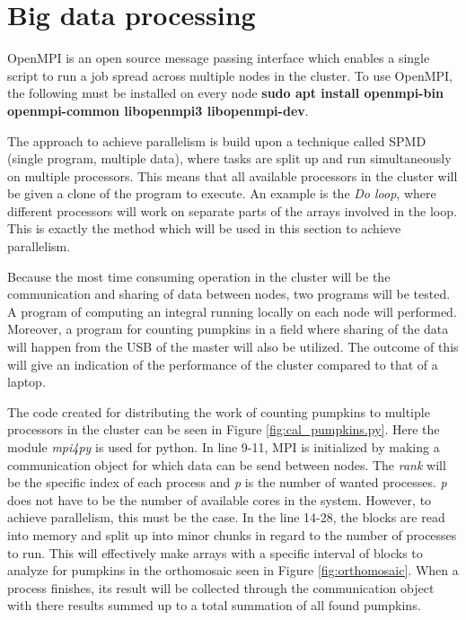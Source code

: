 \documentclass[../Head/Report.tex]{subfiles}
\begin{document}
\section{Big data processing}

OpenMPI is an open source message passing interface which enables a single script to run a job spread across multiple nodes in the cluster. To use OpenMPI, the following must be installed on every node \textbf{sudo apt install openmpi-bin openmpi-common libopenmpi3 libopenmpi-dev}. 

The approach to achieve parallelism is build upon a technique called SPMD (single program, multiple data), where tasks are split up and run simultaneously on multiple processors. This means that all available processors in the cluster will be given a clone of the program to execute. An example is the \textit{Do loop}, where different processors will work on separate parts of the arrays involved in the loop. This is exactly the method which will be used in this section to achieve parallelism.\cite{SPMD}    

Because the most time consuming operation in the cluster will be the communication and sharing of data between nodes, two programs will be tested. A program of computing an integral running locally on each node will performed. Moreover, a program for counting pumpkins in a field where sharing of the data will happen from the USB of the master will also be utilized. The outcome of this will give an indication of the performance of the cluster compared to that of a laptop.     

The code created for distributing the work of counting pumpkins to multiple processors in the cluster can be seen in Figure \ref{fig:cal_pumpkins.py}. Here the module \textit{mpi4py} is used for python. In line 9-11, MPI is initialized  by making a communication object for which data can be send between nodes. The \textit{rank} will be the specific index of each process and \textit{p} is the number of wanted processes. \textit{p} does not have to be the number of available cores in the system. However, to achieve parallelism, this must be the case. In the line 14-28, the blocks are read into memory and split up into minor chunks in regard to the number of processes to run. This will effectively make arrays with a specific interval of blocks to analyze for pumpkins in the orthomosaic seen in Figure \ref{fig:orthomosaic}. When a process finishes, its result will be collected through the communication object with there results summed up to a total summation of all found pumpkins.        
\end{document}
